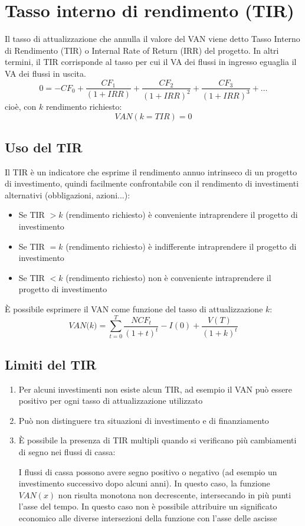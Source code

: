 \section{Tasso interno di rendimento (TIR)}

Il tasso di attualizzazione che annulla il valore del \gls{VAN} viene detto Tasso Interno di Rendimento (TIR) o
Internal Rate of Return (IRR) del progetto. In altri termini, il TIR corrisponde al tasso per cui il \gls{VA} dei flussi in ingresso eguaglia il VA dei flussi in
uscita.
\[
0 = -CF_0 + \frac{CF_1}{\left( 1 + IRR\right) } + \frac{CF_2}{\left( 1 + IRR\right)^2 } + \frac{CF_3}{\left( 1 + IRR\right)^3 } + \dots
\]
cio\`e, con $k$ rendimento richiesto:
\[
VAN(k = TIR) = 0
\]
\subsection{Uso del TIR}
Il TIR è un indicatore che esprime il rendimento annuo intrinseco di un progetto di investimento,
quindi facilmente confrontabile con il rendimento di investimenti alternativi (obbligazioni, azioni...):
\begin{itemize}
	\item Se TIR $> k$ (rendimento richiesto) è conveniente intraprendere il progetto di investimento
	\item Se TIR $= k$ (rendimento richiesto) è indifferente intraprendere il progetto di investimento
	\item Se TIR $< k$ (rendimento richiesto) non è conveniente intraprendere il progetto di investimento
\end{itemize}
È possibile esprimere il \gls{VAN} come funzione del tasso di attualizzazione $k$:
\[
\textit{VAN(k)} = \sum^T_{t=0} \frac{NCF_t}{(1+t)^t} - I(0) + \frac{V(T)}{(1+k)^t}
\]

\subsection{Limiti del TIR}
\begin{enumerate}
	\item Per alcuni investimenti non esiste alcun TIR, ad esempio il \gls{VAN} può essere positivo per ogni tasso di
	attualizzazione utilizzato
	\item Può non distinguere tra situazioni di investimento e di finanziamento
	\item \`E possibile la presenza di TIR multipli quando si verificano più cambiamenti di segno nei flussi di
cassa:
	
		\small{I flussi di cassa possono avere segno positivo o negativo (ad esempio un investimento successivo dopo alcuni
			anni). In questo caso, la funzione $VAN(x)$ non risulta monotona non decrescente, intersecando in più punti
			l’asse del tempo. In questo caso non è possibile attribuire un significato economico alle diverse intersezioni della funzione
			con l’asse delle ascisse}
\end{enumerate}

